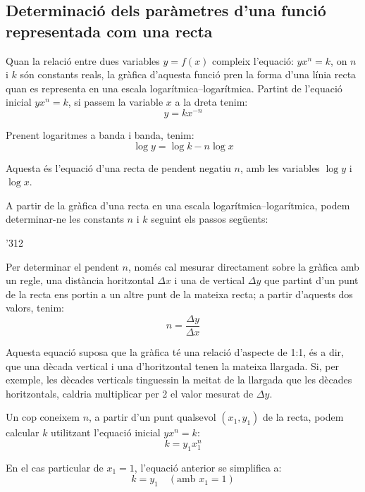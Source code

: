 \subsection{Determinació dels paràmetres d'una funció representada com una recta}\label{sec:escales-log-yxnk}

Quan la relació entre dues variables $y=f(x)$ compleix l'equació: $y x^n = k$, on $n$ i $k$  són constants  reals, la gràfica d'aquesta funció pren la forma d'una línia recta quan es representa en una escala logarítmica--logarítmica. Partint de l'equació inicial $y x^n = k$, si passem la variable $x$ a la dreta tenim:
\begin{equation}
  y = k x^{-n}
\end{equation}

Prenent logaritmes a banda i banda, tenim:
\begin{equation}
  \log y = \log k - n \log x
\end{equation}

Aquesta és l'equació d'una recta de pendent negatiu $n$, amb les variables $\log y$ i $\log x$.

A partir de la gràfica d'una recta en una escala logarítmica--logarítmica, podem determinar-ne les constants $n$ i $k$ seguint els passos següents:

\begin{dingautolist}{'312}
    \item Per  determinar el pendent $n$, només cal mesurar directament sobre la gràfica amb un regle, una distància horitzontal $\Delta{}x$ i una de vertical $\Delta{}y$ que partint d'un punt de la recta ens portin a un altre punt de la mateixa recta; a partir d'aquests dos valors, tenim:
        \begin{equation}
          n = \frac{\Delta{}y}{\Delta{}x}
        \end{equation}

        Aquesta equació suposa que la gràfica té una relació d'aspecte de 1:1, és a dir, que una dècada vertical i una d'horitzontal tenen la mateixa llargada. Si, per exemple, les dècades verticals tinguessin la meitat de la llargada que les dècades  horitzontals, caldria multiplicar per 2 el valor mesurat de $\Delta{}y$.

   \item  Un cop  coneixem $n$, a partir d'un punt qualsevol $(x_1, y_1)$ de la recta, podem calcular $k$ utilitzant l'equació inicial $y x^n = k$:
        \begin{equation}
          k =  y_1 x_1^n
        \end{equation}

        En el cas particular de $x_1=1$, l'equació anterior se simplifica a:\begin{equation}
           k = y_1\quad (\text{amb }x_1=1)
        \end{equation}
\end{dingautolist}

